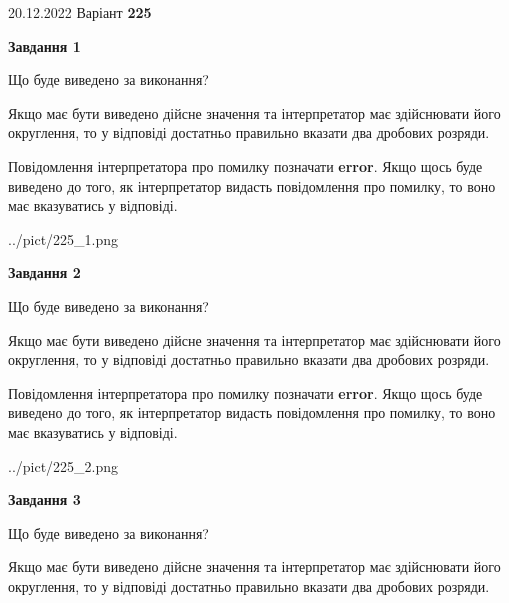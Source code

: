 \documentclass[12pt, ukrainian]{article}
\begin{document}
{20.12.2022 Варіант \No \textbf { 225 }\par}
{
\begin {Large}

{\begin {center}\textbf{Завдання 1}\end {center}}\par
Що буде виведено за виконання? \par

Якщо має бути виведено дійсне значення та інтерпретатор має здійснювати його округлення, 
то у відповіді достатньо правильно вказати два дробових розряди.

Повідомлення інтерпретатора про помилку позначати \textbf{error}.
Якщо щось буде виведено до того, як інтерпретатор видасть повідомлення про помилку, 
то воно має вказуватись у відповіді. \par

\begin{center}
	{../pict/225_1.png}
\end{center}
\newpage

{\begin {center}\textbf{Завдання 2}\end {center}}\par
Що буде виведено за виконання? \par

Якщо має бути виведено дійсне значення та інтерпретатор має здійснювати його округлення, 
то у відповіді достатньо правильно вказати два дробових розряди.

Повідомлення інтерпретатора про помилку позначати \textbf{error}.
Якщо щось буде виведено до того, як інтерпретатор видасть повідомлення про помилку, 
то воно має вказуватись у відповіді. \par

\begin{center}
	{../pict/225_2.png}
\end{center}
\newpage

{\begin {center}\textbf{Завдання 3}\end {center}}\par
Що буде виведено за виконання? \par

Якщо має бути виведено дійсне значення та інтерпретатор має здійснювати його округлення, 
то у відповіді достатньо правильно вказати два дробових розряди.


\end{Large}}
\end{document}

